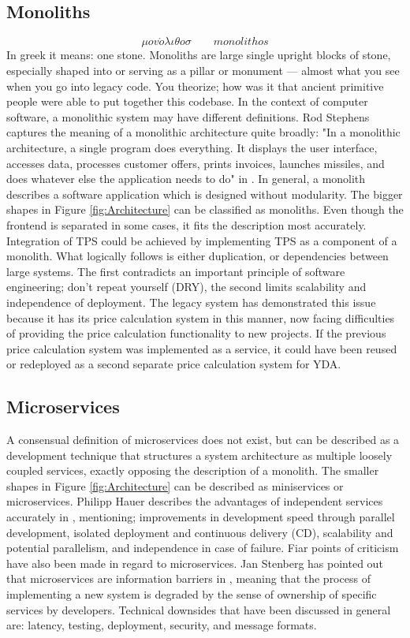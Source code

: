 \subsection{Monoliths}
\[\mu ov \acute{o} \lambda \iota \theta o \sigma \qquad monolithos\]
In greek it means: one stone. Monoliths are large single upright blocks of stone, especially shaped into or serving as a pillar or monument --- almost what you see when you go into legacy code. You theorize; how was it that ancient primitive people were able to put together this codebase. In the context of computer software, a monolithic system may have different definitions. Rod Stephens captures the meaning of a monolithic architecture quite broadly: "In a monolithic architecture, a single program does everything. It displays the user interface, accesses data, processes customer offers, prints invoices, launches missiles, and does whatever else the application needs to do" in \cite{rod-BSE}. In general, a monolith describes a software application which is designed without modularity. The bigger shapes in Figure \ref{fig:Architecture} can be classified as monoliths. Even though the frontend is separated in some cases, it fits the description most accurately. Integration of TPS could be achieved by implementing TPS as a component of a monolith. What logically follows is either duplication, or dependencies between large systems. The first contradicts an important principle of software engineering; don't repeat yourself (DRY), the second limits scalability and independence of deployment. The legacy system has demonstrated this issue because it has its price calculation system in this manner, now facing difficulties of providing the price calculation functionality to new projects. If the previous price calculation system was implemented as a service, it could have been reused or redeployed as a second separate price calculation system for YDA.

\subsection{Microservices}
A consensual definition of microservices does not exist, but can be described as a development technique that structures a system architecture as multiple loosely coupled services, exactly opposing the description of a monolith. The smaller shapes in Figure \ref{fig:Architecture} can be described as miniservices or microservices. Philipp Hauer describes the advantages of independent services accurately in \cite{microservices}, mentioning; improvements in development speed through parallel development, isolated deployment and continuous delivery (CD), scalability and potential parallelism, and independence in case of failure. Fiar points of criticism have also been made in regard to microservices. Jan Stenberg has pointed out that microservices are information barriers in \cite{JS-microservices}, meaning that the process of implementing a new system is degraded by the sense of ownership of specific services by developers. Technical downsides that have been discussed in general are: latency, testing, deployment, security, and message formats.

